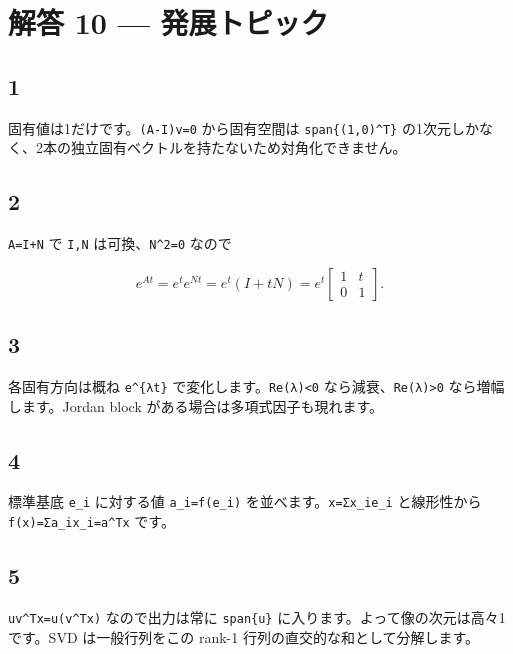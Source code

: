 \documentclass[
  11pt,
  a4paper,
]{ltjsarticle}
\author{}
\date{}
\begin{document}
\hypertarget{ux89e3ux7b54-10-ux767aux5c55ux30c8ux30d4ux30c3ux30af}{%
\section{解答 10 ---
発展トピック}\label{ux89e3ux7b54-10-ux767aux5c55ux30c8ux30d4ux30c3ux30af}}

\hypertarget{section}{%
\subsection{1}\label{section}}

固有値は1だけです。\texttt{(A-I)v=0} から固有空間は
\texttt{span\{(1,0)\^{}T\}}
の1次元しかなく、2本の独立固有ベクトルを持たないため対角化できません。

\hypertarget{section-1}{%
\subsection{2}\label{section-1}}

\texttt{A=I+N} で \texttt{I,N} は可換、\texttt{N\^{}2=0} なので

\[
e^{At}=e^t e^{Nt}=e^t(I+tN)
=e^t\begin{bmatrix}1&t\\0&1\end{bmatrix}.
\]

\hypertarget{section-2}{%
\subsection{3}\label{section-2}}

各固有方向は概ね \texttt{e\^{}\{λt\}}
で変化します。\texttt{Re(λ)\textless{}0}
なら減衰、\texttt{Re(λ)\textgreater{}0} なら増幅します。Jordan block
がある場合は多項式因子も現れます。

\hypertarget{section-3}{%
\subsection{4}\label{section-3}}

標準基底 \texttt{e\_i} に対する値 \texttt{a\_i=f(e\_i)}
を並べます。\texttt{x=Σx\_ie\_i} と線形性から
\texttt{f(x)=Σa\_ix\_i=a\^{}Tx} です。

\hypertarget{section-4}{%
\subsection{5}\label{section-4}}

\texttt{uv\^{}Tx=u(v\^{}Tx)} なので出力は常に \texttt{span\{u\}}
に入ります。よって像の次元は高々1です。SVD は一般行列をこの rank-1
行列の直交的な和として分解します。
\end{document}
